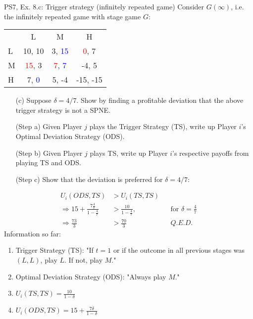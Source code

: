\begin{frame}{PS7, Ex. 8.c: Trigger strategy (infinitely repeated game)}
    Consider $G(\infty)$, i.e. the infinitely repeated game with stage game $G$: \vspace{-6pt}
    \begin{table}
      \begin{tabular}{l|c|c|c|}
        \multicolumn{1}{c}{} & \multicolumn{1}{c}{L} & \multicolumn{1}{c}{M} & \multicolumn{1}{c}{H} \\\cline{2-4}
        L & 10, 10 & 3, \textcolor{blue}{15} & \textcolor{red}{0}, 7 \\\cline{2-4}
        M & \textcolor{red}{15}, 3 & \textcolor{red}{7}, \textcolor{blue}{7} & -4, 5 \\\cline{2-4}
        H & 7, \textcolor{blue}{0} & 5, -4 & -15, -15 \\\cline{2-4}
      \end{tabular}
    \end{table}
    \begin{itemize}
      \vspace{-4pt} \item[(c)] Suppose $\delta = 4/7$. Show by finding a profitable deviation that the above trigger strategy is not a SPNE. \vspace{-6pt}
    \end{itemize}
  \begin{multicols}{2}
    \begin{itemize}
      \item[(Step a)] Given Player $j$ plays the Trigger Strategy (TS), write up Player $i$'s Optimal Deviation Strategy (ODS).
      \item[(Step b)] Given Player $j$ plays TS, write up Player $i$'s respective payoffs from playing TS and ODS.
      \item[(Step c)] Show that the deviation is preferred for $\delta=4/7$:
    \end{itemize}
    \vspace{-8pt}
    \begin{align*}
      U_i\left(ODS,TS\right)&>U_i\left(TS,TS\right)\\
      \Rightarrow15+\frac{7\frac{4}{7}}{1-\frac{4}{7}}&>\frac{10}{1-\frac{4}{7}},&&\text{for }\delta=\frac{4}{7}\\
      \Rightarrow\frac{73}{3}&>\frac{70}{3}&&\textit{Q.E.D.}
    \end{align*}
    \vfill\null\columnbreak
    Information so far:
    \begin{enumerate}
      \item Trigger Strategy (TS): "If $t=1$ or if the outcome in all previous stages was $(L,L)$, play $L$. If not, play $M$."
      \item Optimal Deviation Strategy (ODS): "Always play $M$."
      \item $U_i(TS,TS)=\frac{10}{1-\delta}$
      \item $U_i(ODS,TS)=15+\frac{7\delta}{1-\delta}$
    \end{enumerate}
    \vfill\null
  \end{multicols}
\end{frame}



